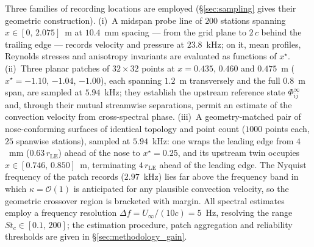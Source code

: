 \documentclass[lineno]{JFM-FLM_Au}
\begin{document}
Three families of recording locations are employed
(\S\ref{sec:sampling} gives their geometric construction).
(i)~A midspan probe line of $200$ stations spanning
$x \in [0,\,2.075]$~m at $10.4$~mm spacing --- from the grid plane to
$2\,c$ behind the trailing edge --- records velocity and pressure at
$23.8$~kHz; on it, mean profiles, Reynolds stresses and anisotropy
invariants are evaluated as functions of $x^{\star}$.
(ii)~Three planar patches of $32\times32$ points at
$x = 0.435$, $0.460$ and $0.475$~m
($x^{\star} = -1.10$, $-1.04$, $-1.00$), each spanning $1.2$~m
transversely and the full $0.8$~m span, are sampled at $5.94$~kHz;
they establish the upstream reference state
$\Phi^{\infty}_{ij}$ and, through their mutual streamwise
separations, permit an estimate of the convection velocity from
cross-spectral phase.
(iii)~A geometry-matched pair of nose-conforming surfaces of
identical topology and point count ($1000$ points each, $25$ spanwise
stations), sampled at $5.94$~kHz: one wraps the leading edge from
$4$~mm ($0.63\,r_{\mathrm{LE}}$) ahead of the nose to
$x^{\star} = 0.25$, and its upstream twin occupies
$x \in [0.746,\,0.850]$~m, terminating $4\,r_{\mathrm{LE}}$ ahead of
the leading edge. The Nyquist frequency of the patch records
($2.97$~kHz) lies far above the frequency band in which
$\kappa = \mathcal{O}(1)$ is anticipated for any plausible convection
velocity, so the geometric crossover region is bracketed with margin.
All spectral estimates employ a frequency resolution
$\Delta f = U_{\infty}/(10c) = 5$~Hz, resolving the range
$St_c \in [0.1,\,200]$; the estimation procedure, patch aggregation
and reliability thresholds are given in \S\ref{sec:methodology_gain}.
\end{document}
